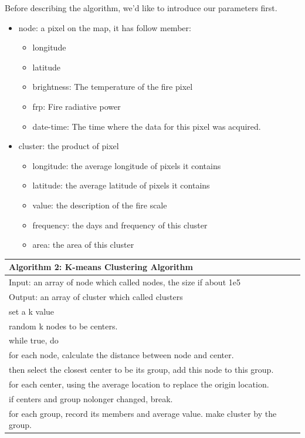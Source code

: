 \documentclass{mcmthesis}
\begin{document}
Before describing the algorithm, we’d like to introduce our parameters ﬁrst.
\begin{itemize}
	\item node: a pixel on the map, it has follow member:
		\begin{itemize}
			\item longitude
			\item latitude
			\item brightness: The temperature of the fire pixel
			\item frp: Fire radiative power
			\item date-time: The time where the data for this pixel was acquired.
		\end{itemize}
	
	\item cluster: the product of pixel
		\begin{itemize}
			\item longitude: the average longitude of pixels it contains
			\item latitude: the average latitude of pixels it contains
			\item value: the description of the fire scale
			\item frequency: the days and frequency of this cluster
			\item area: the area of this cluster
		\end{itemize}
	
\end{itemize}

\begin{tabular}{l}
	\hline
	Algorithm 2: K-means Clustering Algorithm \\
	\hline
	Input: an array of node which called nodes, the size if about 1e5\\
	Output: an array of cluster which called clusters\\
	set a k value \\
	random k nodes to be centers.\\
	while true, do \\
	\qquad for each node, calculate the distance between node and center.\\
	\qquad then select the closest center to be its group, add this node to this group.\\
	\qquad for each center, using the average location to replace the origin location. \\
	\qquad if centers and group nolonger changed, break.\\
	for each group, record its members and average value. make cluster by the group. \\ 
	\hline
\end{tabular}
\end{document}
